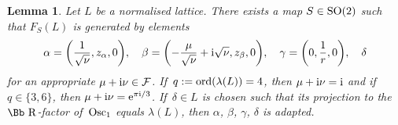 \documentclass[10pt,a4paper]{amsart}
\newcommand\RR{{\mbox{\Bb R}}}
\newcommand\cF{{\mathcal F}}
\newcommand{\SO}{\mathop{{\rm SO}}}
\newcommand{\Osc}{{\rm Osc}}
\newcommand{\ord}{{\rm ord}}
\numberwithin{equation}{section}
\newtheorem{Lemma}[Theorem]{Lemma}
\begin{document}
\begin{Lemma} \label{lm:generatorChoice}
Let $L$ be a normalised lattice. There exists a map $S\in\SO(2)$ such that $F_S(L)$ is generated by elements
\begin{gather}\label{eq:generators'}
\alpha=\bigg(\frac 1{\sqrt\nu},z_\alpha,0\bigg),\quad
\beta=\bigg({-}\frac{\mu}{\sqrt\nu}+{\rm i}\sqrt\nu ,z_\beta,0\bigg),\quad
\gamma=\bigg(0,\frac 1r,0\bigg),\quad \delta
\end{gather}
 for an appropriate $\mu+{\rm i}\nu\in\cF$. If~$q:=\ord(\lambda(L))=4$, then $\mu+{\rm i}\nu={\rm i}$ and if $q\in\{3,6\}$, then $\mu+{\rm i}\nu= {\rm e}^{\pi {\rm i}/3}$. If~$\delta\in L$ is chosen such that its projection to the $\RR$-factor of~$\Osc_1$ equals $\lambda(L)$, then $\alpha$, $\beta$, $\gamma$, $\delta$ is adapted.
\end{Lemma}
\end{document}
